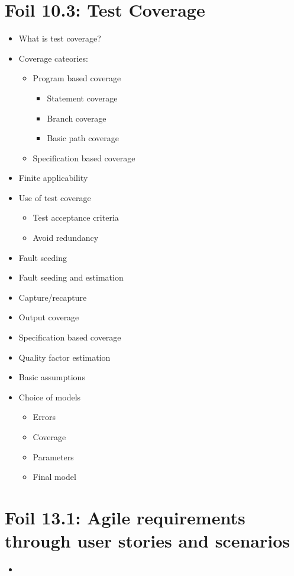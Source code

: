 	\section{Foil 10.3: Test Coverage}
		\begin{itemize}
			\item What is test coverage?
			\item Coverage cateories:
				\begin{itemize}
					\item Program based coverage
						\begin{itemize}
							\item Statement coverage
							\item Branch coverage
							\item Basic path coverage
						\end{itemize}
					\item Specification based coverage
				\end{itemize}
			\item Finite applicability
			\item Use of test coverage
				\begin{itemize}
					\item Test acceptance criteria
					\item Avoid redundancy
				\end{itemize}
			\item Fault seeding
			\item Fault seeding and estimation
			\item Capture/recapture
			\item Output coverage
			\item Specification based coverage
			\item Quality factor estimation
			\item Basic assumptions
			\item Choice of models 
				\begin{itemize}
					\item Errors
					\item Coverage
					\item Parameters
					\item Final model
				\end{itemize}

		\end{itemize}



	\section{Foil 13.1: Agile requirements through user stories and scenarios}
		\begin{itemize}
			\item 
		\end{itemize}

